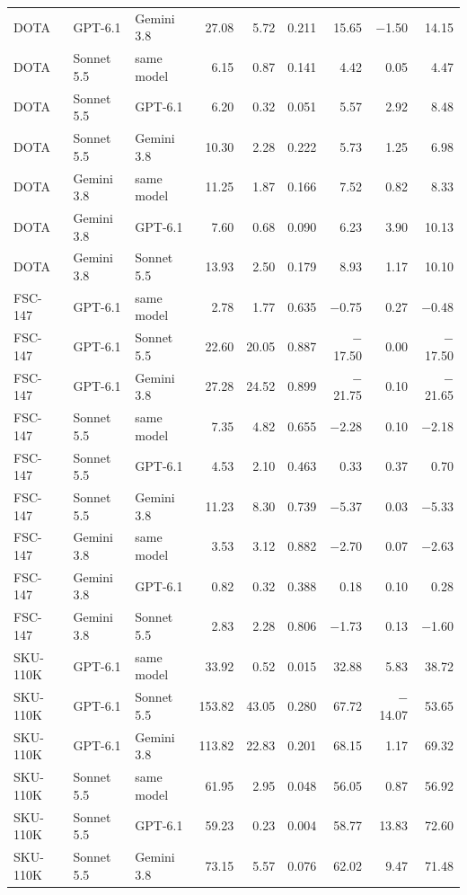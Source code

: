 {\begin{longtable}{@{}lllrrrrrr@{}}
DOTA & GPT-6.1 & Gemini 3.8 & 27.08 & 5.72 & 0.211 & 15.65 & $-$1.50 & 14.15 \\
DOTA & Sonnet 5.5 & same model & 6.15 & 0.87 & 0.141 & 4.42 & 0.05 & 4.47 \\
DOTA & Sonnet 5.5 & GPT-6.1 & 6.20 & 0.32 & 0.051 & 5.57 & 2.92 & 8.48 \\
DOTA & Sonnet 5.5 & Gemini 3.8 & 10.30 & 2.28 & 0.222 & 5.73 & 1.25 & 6.98 \\
DOTA & Gemini 3.8 & same model & 11.25 & 1.87 & 0.166 & 7.52 & 0.82 & 8.33 \\
DOTA & Gemini 3.8 & GPT-6.1 & 7.60 & 0.68 & 0.090 & 6.23 & 3.90 & 10.13 \\
DOTA & Gemini 3.8 & Sonnet 5.5 & 13.93 & 2.50 & 0.179 & 8.93 & 1.17 & 10.10 \\
\midrule
FSC-147 & GPT-6.1 & same model & 2.78 & 1.77 & 0.635 & $-$0.75 & 0.27 & $-$0.48 \\
FSC-147 & GPT-6.1 & Sonnet 5.5 & 22.60 & 20.05 & 0.887 & $-$17.50 & 0.00 & $-$17.50 \\
FSC-147 & GPT-6.1 & Gemini 3.8 & 27.28 & 24.52 & 0.899 & $-$21.75 & 0.10 & $-$21.65 \\
FSC-147 & Sonnet 5.5 & same model & 7.35 & 4.82 & 0.655 & $-$2.28 & 0.10 & $-$2.18 \\
FSC-147 & Sonnet 5.5 & GPT-6.1 & 4.53 & 2.10 & 0.463 & 0.33 & 0.37 & 0.70 \\
FSC-147 & Sonnet 5.5 & Gemini 3.8 & 11.23 & 8.30 & 0.739 & $-$5.37 & 0.03 & $-$5.33 \\
FSC-147 & Gemini 3.8 & same model & 3.53 & 3.12 & 0.882 & $-$2.70 & 0.07 & $-$2.63 \\
FSC-147 & Gemini 3.8 & GPT-6.1 & 0.82 & 0.32 & 0.388 & 0.18 & 0.10 & 0.28 \\
FSC-147 & Gemini 3.8 & Sonnet 5.5 & 2.83 & 2.28 & 0.806 & $-$1.73 & 0.13 & $-$1.60 \\
\midrule
SKU-110K & GPT-6.1 & same model & 33.92 & 0.52 & 0.015 & 32.88 & 5.83 & 38.72 \\
SKU-110K & GPT-6.1 & Sonnet 5.5 & 153.82 & 43.05 & 0.280 & 67.72 & $-$14.07 & 53.65 \\
SKU-110K & GPT-6.1 & Gemini 3.8 & 113.82 & 22.83 & 0.201 & 68.15 & 1.17 & 69.32 \\
SKU-110K & Sonnet 5.5 & same model & 61.95 & 2.95 & 0.048 & 56.05 & 0.87 & 56.92 \\
SKU-110K & Sonnet 5.5 & GPT-6.1 & 59.23 & 0.23 & 0.004 & 58.77 & 13.83 & 72.60 \\
SKU-110K & Sonnet 5.5 & Gemini 3.8 & 73.15 & 5.57 & 0.076 & 62.02 & 9.47 & 71.48 \\

\end{longtable}}
